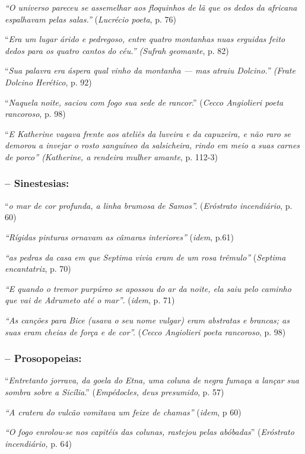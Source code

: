 \documentclass[12pt]{extarticle}
\begin{document}
\emph{``O universo pareceu se assemelhar aos floquinhos de lã que os
dedos da africana espalhavam pelas salas.''} (\emph{Lucrécio poeta}, p.
76)

``\emph{Era um lugar árido e pedregoso, entre quatro montanhas nuas
erguidas feito dedos para os quatro cantos do céu.'' (Sufrah geomante},
p. 82)

``\emph{Sua palavra era áspera qual vinho da montanha --- mas atraiu
Dolcino.'' (Frate Dolcino Herético}, p. 92)

``\emph{Naquela noite, saciou com fogo sua sede de rancor}.''
(\emph{Cecco Angiolieri poeta rancoroso}, p. 98)

``\emph{E Katherine vagava frente aos ateliês da luveira e da capuzeira,
e não raro se demorou a invejar o rosto sanguíneo da salsicheira, rindo
em meio a suas carnes de porco'' (Katherine, a rendeira mulher amante},
p. 112-3)


\subsubsection{-- Sinestesias:}

``\emph{o mar de cor profunda, a linha brumosa de Samos''.}
(\emph{Eróstrato incendiário}, p. 60)

\emph{``Rígidas pinturas ornavam as câmaras interiores''} (\emph{idem},
p.61)

\emph{``as pedras da casa em que Septima vivia eram de um rosa
trêmulo''} (\emph{Septima encantatriz}, p. 70)

\emph{``E quando o tremor purpúreo se apossou do ar da noite, ela saiu
pelo caminho que vai de Adrumeto até o mar''}. (\emph{idem}, p. 71)

\emph{``As canções para Bice (usava o seu nome vulgar) eram abstratas e
brancas; as suas eram cheias de força e de cor''.} (\emph{Cecco
Angiolieri poeta rancoroso}, p. 98)

\subsubsection{-- Prosopopeias:}

``\emph{Entretanto jorrava, da goela do Etna, uma coluna de negra fumaça
a lançar sua sombra sobre a Sicília}.'' (\emph{Empédocles, deus
presumido}, p. 57)

\emph{``A cratera do vulcão vomitava um feixe de chamas''} (\emph{idem},
p 60)

\emph{``O fogo enrolou-se nos capitéis das colunas, rastejou pelas
abóbadas}'' (\emph{Eróstrato incendiário,} p. 64)
\end{document}
